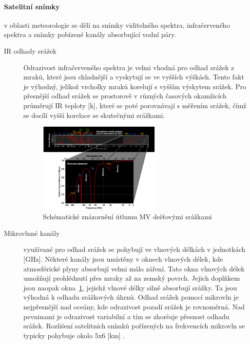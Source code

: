 \documentclass[a4paper,12pt]{article}
\begin{document}
\paragraph*{Satelitní snímky} v oblasti meteorologie se dělí na snímky viditelného spektra, infračerveného spektra a snímky pobízené kanály absorbující vodní páry. 
\begin{description}
\item[IR odhady srážek] Odrazivost infračerveného spektra je velmi vhodná pro odhad srážek z mraků, které jsou chladnější a vyskytují se ve vyšších výškách. Tento fakt je výhodný, jelikož vrcholky mraků korelují s vyšším výskytem srážek. Pro přesnější odhad srážek se prostorově v různých časových okamžicích průměrují \acs{IR} teploty [k], které se poté porovnávají s měřením srážek, čímž se docílí vyšší korelace se skutečnými srážkami.

\begin{figure}[h!]
    \centering
    \includegraphics[width=0.6\textwidth]{./img/srazky/electrom.png}
    \caption[Rušení radaru]{\centering Schématické znázornění útlumu MV dešťovými srážkami  \footnotemark }
    \label{fig:spektr}
 \end{figure}   


\item[Mikrovlnné kanály] využívané pro odhad srážek se pohybují ve vlnových délkách v jednotkách [GHz]. Některé kanály jsou umístěny v oknech vlnových délek, kde atmosférické plyny absorbují velmi málo záření. Tato okna vlnových délek umožňují prohlédnutí přes mraky až na zemský povrch. Jejich doplňkem jsou naopak okna~\ref{fig:spektr}, jejichž vlnové délky silně absorbují srážky. Ta jsou výhodná k odhadu srážkových úhrnů. Odhad srážek pomocí mikrovln je nejpřesnější nad oceány, kde odrazivost pozadí srážek je rovnoměrná. Nad pevninami je odrazivost variabilní a tím se zhoršuje přesnost odhadu srážek. Rozlišení satelitních snímků pořízených na frekvencích mikrovln se typicky pohybuje okolo 5x6 [km] .
\end{description}
\end{document}

